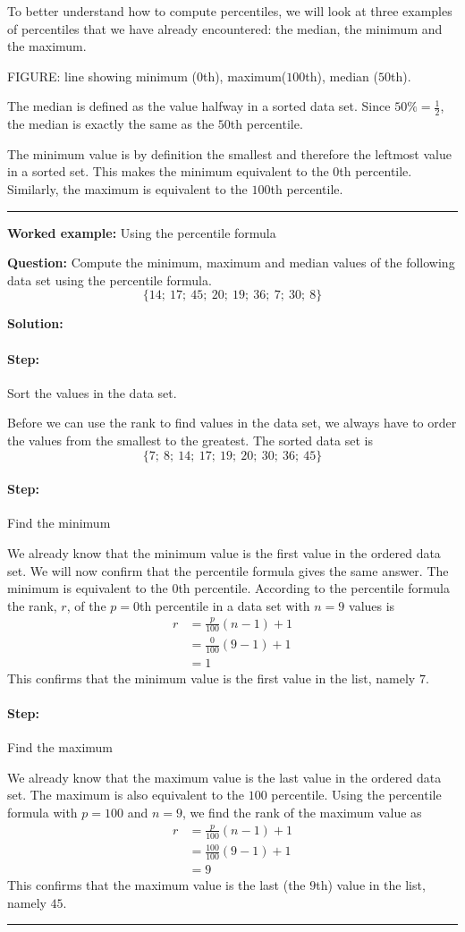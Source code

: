 \documentclass[a4paper,11pt]{report}
\newenvironment{wex}[3]%
{\rule{\linewidth}{0.5mm}
\textbf{Worked example:} #1

\textbf{Question:} #2

\textbf{Solution:} #3}%
{\rule{\linewidth}{0.5mm}}
\newcommand{\westep}[1]{\paragraph{Step:} #1}
\begin{document}
To better understand how to compute percentiles, we will look at three
examples of percentiles that we have already encountered: the median,
the minimum and the maximum.

FIGURE: line showing minimum ($0$th), maximum($100$th), median ($50$th).

The median is defined as the value halfway in a sorted data set. Since
$50\% = \frac{1}{2}$, the median is exactly the same as the $50$th
percentile.

The minimum value is by definition the smallest and therefore the
leftmost value in a sorted set. This makes the minimum equivalent to
the $0$th percentile. Similarly, the maximum is equivalent to the $100$th
percentile.

\begin{wex}{Using the percentile formula}{
    Compute the minimum, maximum and median values of the following
    data set using the percentile formula.
    \begin{equation}
      \{14;\ 17;\ 45;\ 20;\ 19;\ 36;\ 7;\ 30;\ 8\}
    \end{equation}
}{
    \westep{Sort the values in the data set.}

    Before we can use the rank to find values in the data set, we
    always have to order the values from the smallest to the
    greatest. The sorted data set is
    \begin{equation}
      \{7;\ 8;\ 14;\ 17;\ 19;\ 20;\ 30;\ 36;\ 45\}
    \end{equation}

    \westep{Find the minimum}

    We already know that the minimum value is the first value in the
    ordered data set. We will now confirm that the percentile formula
    gives the same answer. The minimum is equivalent to the $0$th
    percentile. According to the percentile formula the rank, $r$, of the
    $p = 0$th percentile in a data set with $n=9$ values is
    \begin{align}
      r &= \frac{p}{100}\left(n-1\right)+1 \\
        &= \frac{0}{100}\left(9-1\right)+1 \\
        &= 1
    \end{align}
    This confirms that the minimum value is the first value in the
    list, namely $7$.

    \westep{Find the maximum}

    We already know that the maximum value is the last value in the
    ordered data set. The maximum is also equivalent to the $100$
    percentile. Using the percentile formula with $p=100$ and $n=9$,
    we find the rank of the maximum value as
    \begin{align}
      r &= \frac{p}{100}\left(n-1\right)+1 \\
        &= \frac{100}{100}\left(9-1\right)+1 \\
        &= 9
    \end{align}
    This confirms that the maximum value is the last (the $9$th) value
    in the list, namely $45$.

}
\end{wex}
\end{document}
